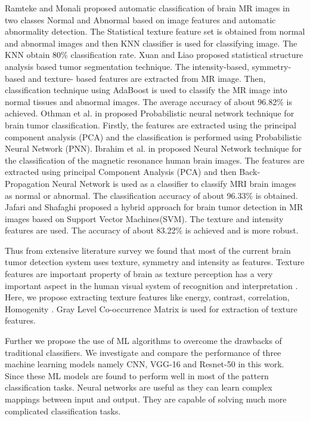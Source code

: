 	Ramteke and Monali \cite{article2} proposed automatic classification of
	brain MR images in two classes Normal and Abnormal based on image features
	and automatic abnormality detection. The Statistical texture feature set is
	obtained from normal and abnormal images and then KNN classifier is used for
	classifying image. The KNN obtain 80\% classification rate.  Xuan and Liao
	\cite{4297123} proposed statistical structure analysis based tumor
	segmentation technique. The intensity-based, symmetry-based and texture-
	based features are extracted from MR image. Then, classification technique
	using AdaBoost is used to classify the MR image into normal tissues and
	abnormal images. The average accuracy of about 96.82\% is achieved. Othman
	et al. in \cite{5730335} proposed Probabilistic neural network technique for
	brain tumor classification. Firstly, the features are extracted using the
	principal component analysis (PCA) and the classification is performed using
	Probabilistic Neural Network (PNN).  Ibrahim et al. in \cite{inproceedings2}
	proposed Neural Network technique for the classification of the magnetic
	resonance human brain images. The features are extracted using principal
	Component Analysis (PCA) and then Back- Propagation Neural Network is used
	as a classifier to classify MRI brain images as normal or abnormal. The
	classification accuracy of about 96.33\% is obtained. Jafari and Shafaghi
	\cite{article3} proposed a hybrid approach for brain tumor detection in MR
	images based on Support Vector Machines(SVM). The texture and intensity
	features are used. The accuracy of about 83.22\% is achieved and is more
	robust.

	Thus from extensive literature survey we found that most of the current
	brain tumor detection system uses texture, symmetry and intensity as
	features. Texture features are important property of brain as texture
	perception has a very important aspect in the human visual system of
	recognition and interpretation \cite{article4}. Here, we propose extracting
	texture features like energy, contrast, correlation, Homogenity
	\cite{6524466}. Gray Level Co-occurrence Matrix is used for extraction of
	texture features.

	Further we propose the use of ML algorithms to overcome the drawbacks of
	traditional classifiers. We investigate and compare the performance of three
	machine learning models namely CNN, VGG-16 and Resnet-50 in this work. Since
	these ML models are found to perform well in most of the pattern
	classification tasks. Neural networks are useful as they can learn complex
	mappings between input and output. They are capable of solving much more
	complicated classification tasks.
